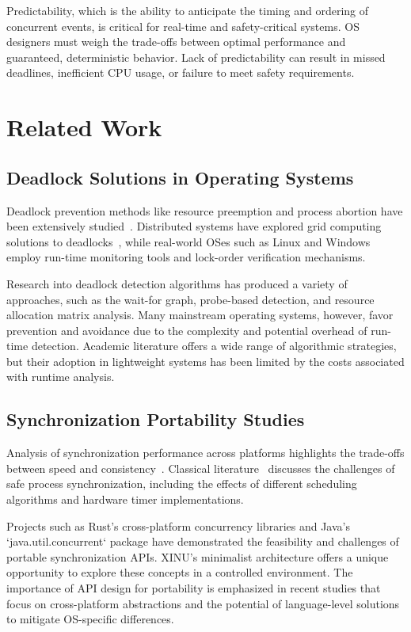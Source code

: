 \documentclass[conference,a4paper]{IEEEtran}
\begin{document}
Predictability, which is the ability to anticipate the timing and ordering of concurrent events, is critical for real-time and safety-critical systems. OS designers must weigh the trade-offs between optimal performance and guaranteed, deterministic behavior. Lack of predictability can result in missed deadlines, inefficient CPU usage, or failure to meet safety requirements.

\section{Related Work}

\subsection{Deadlock Solutions in Operating Systems}

Deadlock prevention methods like resource preemption and process abortion have been extensively studied~\cite{jetir, bbk}. Distributed systems have explored grid computing solutions to deadlocks~\cite{ijcsns}, while real-world OSes such as Linux and Windows employ run-time monitoring tools and lock-order verification mechanisms.

Research into deadlock detection algorithms has produced a variety of approaches, such as the wait-for graph, probe-based detection, and resource allocation matrix analysis. Many mainstream operating systems, however, favor prevention and avoidance due to the complexity and potential overhead of run-time detection. Academic literature offers a wide range of algorithmic strategies, but their adoption in lightweight systems has been limited by the costs associated with runtime analysis.

\subsection{Synchronization Portability Studies}

Analysis of synchronization performance across platforms highlights the trade-offs between speed and consistency~\cite{arxiv}. Classical literature~\cite{devto} discusses the challenges of safe process synchronization, including the effects of different scheduling algorithms and hardware timer implementations.

Projects such as Rust’s cross-platform concurrency libraries and Java’s `java.util.concurrent` package have demonstrated the feasibility and challenges of portable synchronization APIs. XINU’s minimalist architecture offers a unique opportunity to explore these concepts in a controlled environment. The importance of API design for portability is emphasized in recent studies that focus on cross-platform abstractions and the potential of language-level solutions to mitigate OS-specific differences.
\end{document}
